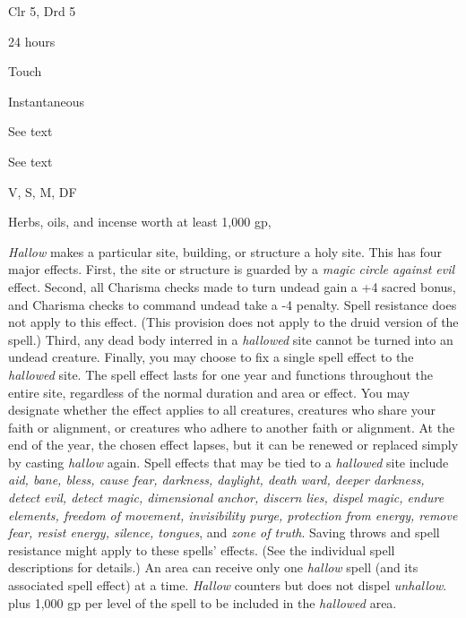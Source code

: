 
\begin{description*}
\item[Level:] Clr 5, Drd 5
\item[Casting Time:] 24 hours
\item[Range:] Touch
\item[Duration:] Instantaneous
\item[Saving Throw:] See text
\item[Spell Resistance:] See text
\item[Components:] V, S, M, DF
\item[Arcane Material Component:] Herbs, oils, and incense worth at least 1,000 gp,
\end{description*}

\textit{Hallow} makes a particular site, building, or structure a holy site. This
has four major effects.
First, the site or structure is guarded by a \textit{magic circle against evil}
effect.
Second, all Charisma checks made to turn undead gain a +4 sacred bonus, and Charisma
checks to command undead take a -4 penalty. Spell resistance does not apply to
this effect. (This provision does not apply to the druid version of the spell.)
Third, any dead body interred in a \textit{hallowed} site cannot be turned into
an undead creature.
Finally, you may choose to fix a single spell effect to the \textit{hallowed} site.
The spell effect lasts for one year and functions throughout the entire site, regardless
of the normal duration and area or effect. You may designate whether the effect
applies to all creatures, creatures who share your faith or alignment, or creatures
who adhere to another faith or alignment. At the end of the year, the chosen effect
lapses, but it can be renewed or replaced simply by casting \textit{hallow} again.
Spell effects that may be tied to a \textit{hallowed} site include \textit{aid,
bane, bless, cause fear, darkness, daylight, death ward, deeper darkness, detect
evil, detect magic, dimensional anchor, discern lies, dispel magic, endure elements,
freedom of movement, invisibility purge, protection from energy, remove fear, resist
energy, silence, tongues}, and \textit{zone of truth}. Saving throws and spell
resistance might apply to these spells' effects. (See the individual spell descriptions
for details.)
An area can receive only one \textit{hallow} spell (and its associated spell effect)
at a time. \textit{Hallow} counters but does not dispel \textit{unhallow}.
plus 1,000 gp per level of the spell to be included in the \textit{hallowed} area.